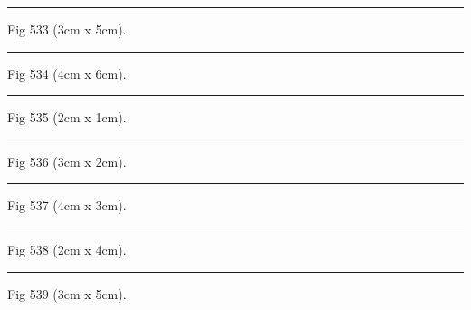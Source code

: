 \documentclass[a4paper,11pt]{article}
\begin{document}
\begin{swarmwrap}%
  \begin{minipage}[t]{3cm}
    \centering
    \rule{\linewidth}{5cm}
    {\footnotesize Fig 533 (3cm x 5cm).}
  \end{minipage}%
\end{swarmwrap}%
\swarmwrapnext
\lipsum[83]%

\begin{swarmwrap}%
  \begin{minipage}[t]{4cm}
    \centering
    \rule{\linewidth}{6cm}
    {\footnotesize Fig 534 (4cm x 6cm).}
  \end{minipage}%
\end{swarmwrap}%
\swarmwrapnext
\lipsum[84]%

\begin{swarmwrap}%
  \begin{minipage}[t]{2cm}
    \centering
    \rule{\linewidth}{1cm}
    {\footnotesize Fig 535 (2cm x 1cm).}
  \end{minipage}%
\end{swarmwrap}%
\swarmwrapnext
\lipsum[85]%

\begin{swarmwrap}%
  \begin{minipage}[t]{3cm}
    \centering
    \rule{\linewidth}{2cm}
    {\footnotesize Fig 536 (3cm x 2cm).}
  \end{minipage}%
\end{swarmwrap}%
\swarmwrapnext
\lipsum[86]%

\begin{swarmwrap}%
  \begin{minipage}[t]{4cm}
    \centering
    \rule{\linewidth}{3cm}
    {\footnotesize Fig 537 (4cm x 3cm).}
  \end{minipage}%
\end{swarmwrap}%
\swarmwrapnext
\lipsum[87]%

\begin{swarmwrap}%
  \begin{minipage}[t]{2cm}
    \centering
    \rule{\linewidth}{4cm}
    {\footnotesize Fig 538 (2cm x 4cm).}
  \end{minipage}%
\end{swarmwrap}%
\swarmwrapnext
\lipsum[88]%

\begin{swarmwrap}%
  \begin{minipage}[t]{3cm}
    \centering
    \rule{\linewidth}{5cm}
    {\footnotesize Fig 539 (3cm x 5cm).}
  \end{minipage}%
\end{swarmwrap}%
\swarmwrapnext
\lipsum[89]%
\end{document}
